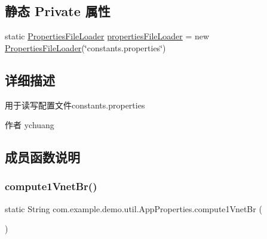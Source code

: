 \subsection*{静态 Private 属性}
\begin{DoxyCompactItemize}
\item 
static \mbox{\hyperlink{classcom_1_1example_1_1demo_1_1util_1_1_properties_file_loader}{Properties\+File\+Loader}} \mbox{\hyperlink{classcom_1_1example_1_1demo_1_1util_1_1_app_properties_a7f234aa2b44697f33883cbccbdea8b75}{properties\+File\+Loader}} = new \mbox{\hyperlink{classcom_1_1example_1_1demo_1_1util_1_1_properties_file_loader}{Properties\+File\+Loader}}(\char`\"{}constants.\+properties\char`\"{})
\end{DoxyCompactItemize}


\subsection{详细描述}
用于读写配置文件constants.\+properties 

\begin{DoxyAuthor}{作者}
ychuang 
\end{DoxyAuthor}


\subsection{成员函数说明}
\mbox{\label{classcom_1_1example_1_1demo_1_1util_1_1_app_properties_a676cdb26c2880dc78a88433d47f46d67}} 
\subsubsection{\texorpdfstring{compute1\+Vnet\+Br()}{compute1VnetBr()}}
{\footnotesize\ttfamily static String com.\+example.\+demo.\+util.\+App\+Properties.\+compute1\+Vnet\+Br (\begin{DoxyParamCaption}{ }\end{DoxyParamCaption})\hspace{0.3cm}{\ttfamily [static]}}

\mbox{\label{classcom_1_1example_1_1demo_1_1util_1_1_app_properties_ad2b7be2759536bca62775d022bff4b1f}} 

